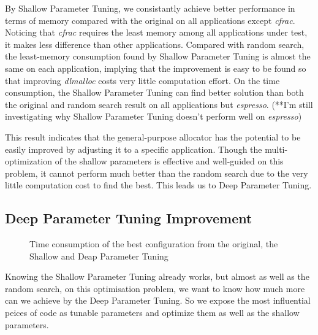 By Shallow Parameter Tuning, we consistantly achieve better performance in terms of memory compared with the original on all applications except \emph{cfrac}. Noticing that \emph{cfrac} requires the least memory among all applications under test, it makes less difference than other applications. Compared with random search, the least-memory consumption found by Shallow Parameter Tuning is almost the same on each application, implying that the improvement is easy to be found so that improving \emph{dlmalloc} costs very little computation effort. On the time consumption, the Shallow Parameter Tuning can find better solution than both the original and random search result on all applications but \emph{espresso}. (**I'm still investigating why Shallow Parameter Tuning doesn't perform well on \emph{espresso})

This result indicates that the general-purpose allocator has the potential to be easily improved by adjusting it to a specific application. Though the multi-optimization of the shallow parameters is effective and well-guided on this problem, it cannot perform much better than the random search due to the very little computation cost to find the best. This leads us to Deep Parameter Tuning.

\subsection{Deep Parameter Tuning Improvement}

\begin{figure}[htbp]
	\centering
	\caption{Time consumption of the best configuration from the original, the Shallow and Deap Parameter Tuning}\label{fig_sig}
\end{figure}

Knowing the Shallow Parameter Tuning already works, but almost as well as the random search, on this optimisation problem, we want to know how much more can we achieve by the Deep Parameter Tuning. So we expose the most influential peices of code as tunable parameters and optimize them as well as the shallow parameters. 

